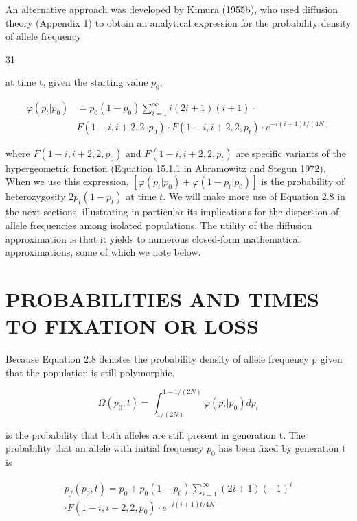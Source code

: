 \documentclass{article}
\begin{document}
An alternative approach was developed by Kimura (1955b), who used diffusion theory (Appendix 1) to obtain an analytical expression for the probability density of allele frequency

31

at time t, given the starting value  $ p_{0} $,

\begin{equation}
\begin{align*}\varphi(p_{t}|p_{0})&=p_{0}(1-p_{0})\sum_{i=1}^{\infty}i(2i+1)(i+1)\cdot\\&F(1-i,i+2,2,p_{0})\cdot F(1-i,i+2,2,p_{t})\cdot e^{-i(i+1)t/(4N)}\end{align*}
\tag{2.8}
\label{eq:2_8}
\end{equation}

where  $ F(1-i, i+2, 2, p_0) $ and  $ F(1-i, i+2, 2, p_t) $ are specific variants of the hypergeometric function (Equation 15.1.1 in Abramowitz and Stegun 1972). When we use this expression,  $ [\varphi(p_t|p_0) + \varphi(1-p_t|p_0)] $ is the probability of heterozygosity  $ 2p_t(1-p_t) $ at time  $ t $. We will make more use of Equation 2.8 in the next sections, illustrating in particular its implications for the dispersion of allele frequencies among isolated populations. The utility of the diffusion approximation is that it yields to numerous closed-form mathematical approximations, some of which we note below.

\section{PROBABILITIES AND TIMES TO FIXATION OR LOSS}
Because Equation 2.8 denotes the probability density of allele frequency p given that the population is still polymorphic,

\begin{equation}
\Omega(p_{0},t)=\int_{1/(2N)}^{1-1/(2N)}\varphi(p_{t}|p_{0})d p_{t}
\tag{2.9a}
\label{eq:2_9a}
\end{equation}

is the probability that both alleles are still present in generation t. The probability that an allele with initial frequency  $ p_{0} $ has been fixed by generation t is

\begin{equation}
\begin{align*}p_{f}(p_{0},t)=p_{0}+p_{0}(1-p_{0})\sum_{i=1}^{\infty}(2i+1)(-1)^{i}\\ \cdot F(1-i,i+2,2,p_{0})\cdot e^{-i(i+1)t/4N}\end{align*}
\tag{2.9b}
\label{eq:2_9b}
\end{equation}
\end{document}
